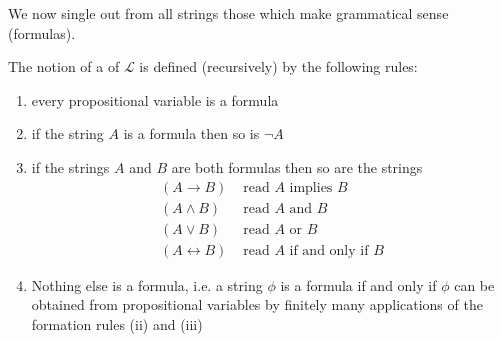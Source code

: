 We now single out from all strings those which make grammatical sense (formulas).

\begin{definition}[Formula]
The notion of a  of $\mathcal{L}$ is defined (recursively) by the following rules:
\begin{enumerate}[label=(\roman*)]
\item every propositional variable is a formula
\item if the string $A$ is a formula then so is $\lnot A$
\item if the strings $A$ and $B$ are both formulas then so are the strings
\begin{align*}
(A\rightarrow B)&\text{ read $A$ implies $B$}\\
(A\land B)&\text{ read $A$ and $B$}\\
(A\lor B)&\text{ read $A$ or $B$}\\
(A\leftrightarrow B)&\text{ read $A$ if and only if $B$}
\end{align*}
\item Nothing else is a formula, i.e. a string $\phi$ is a formula if and only if $\phi$ can be obtained from propositional variables by finitely many applications of the formation rules (ii) and (iii)
\end{enumerate}
\end{definition}
